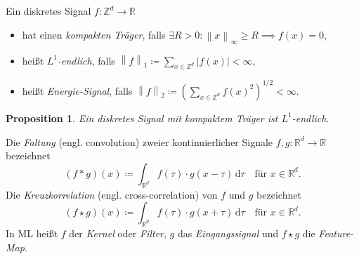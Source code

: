 \documentclass[envcountsect, smaller, aspectratio=149]{beamer}
\newtheorem{proposition}{Proposition}
\newcommand{\diff}{\,\textrm{d}}
\newcommand{\R}{\mathbb{R}}
\newcommand{\Z}{\mathbb{Z}}
\newcommand{\norm}[1]{\left\lVert#1\right\rVert}
\newcommand{\abs}[1]{\left\lvert#1\right\rvert}
\begin{document}
\begin{frame}[t]
    \begin{definition}
        Ein diskretes Signal $f:\Z^d \rightarrow \R$
        \begin{itemize}
            \item hat einen \emph{kompakten Träger}, falls $\exists R > 0: \norm{x}_\infty \geq R \implies f(x) = 0$,
            \item heißt  \emph{$L^1$-endlich}, falls $\norm{f}_1 \coloneqq \sum_{x\in\Z^d} \abs{f(x)} < \infty$,
            \item heißt \emph{Energie-Signal}, falls $\norm{f}_2 \coloneqq \left(\sum_{x\in\Z^d} f(x)^2 \right)^{1/2} < \infty$.
        \end{itemize}
    \end{definition}
    \pause \begin{proposition}
        Ein diskretes Signal mit kompaktem Träger ist $L^1$-endlich.
    \end{proposition}
\end{frame}



\begin{frame}[t]
    \begin{definition}
        Die \emph{Faltung} (engl. \foreignlanguage{english}{convolution}) zweier kontinuierlicher Signale $f,g: \R^d \rightarrow \R$ bezeichnet
        \[
          (f*g) (x) \coloneqq \int_{\R^d} f(\tau) \cdot g(x-\tau) \diff \tau \quad\text{für $x\in \R^d$}.
        \]%
        Die \emph{Kreuzkorrelation} (engl. \foreignlanguage{english}{cross-correlation}) von $f$ und $g$ bezeichnet
        \[
            (f\star g) (x) \coloneqq \int_{\R^d} f(\tau) \cdot g(x+\tau) \diff \tau \quad\text{für $x\in \R^d$}.
        \]
        \pause
        In ML heißt $f$ der \emph{Kernel} oder \emph{Filter}, $g$ das \emph{Eingangssignal} 
        und $f\star g$ die \emph{Feature-Map}.
    \end{definition}
    
\end{frame}
\end{document}
